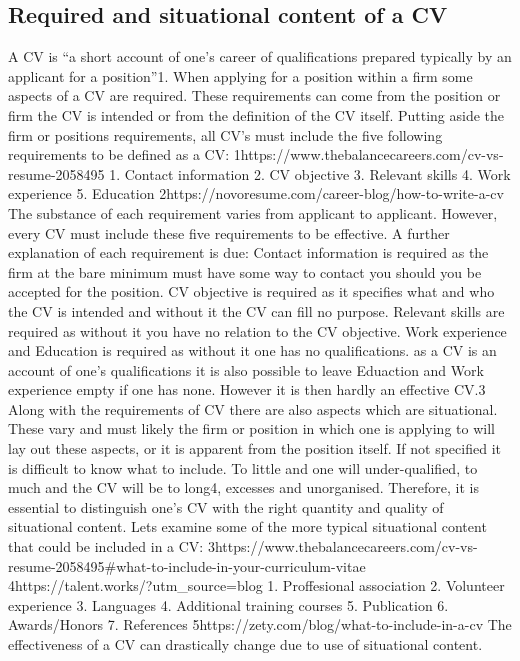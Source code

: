 \subsection{Required and situational content of a CV}
A CV  is “a short account of one’s career of qualifications prepared typically by an applicant for a position”1.
When applying for a position within a firm some aspects of a CV are required.
These requirements can come from the position or firm the CV is intended or from the definition of the CV itself.
Putting aside the firm or positions requirements, all CV’s must include the five following requirements to be defined as a CV:
1https://www.thebalancecareers.com/cv-vs-resume-2058495
1. Contact information
2. CV objective
3. Relevant skills
4. Work experience
5. Education
2https://novoresume.com/career-blog/how-to-write-a-cv
The substance of each requirement varies from applicant to applicant. However, every CV must include these five requirements to be effective.
A further explanation of each requirement is due:
Contact information is required as the firm at the bare minimum must have some way to contact you should you be accepted for the position.
CV objective is required as it specifies what and who the CV is intended and without it the CV can fill no purpose.
Relevant skills are required as without it you have no relation to the CV objective.
Work experience and Education is required as without it one has no qualifications.
as a CV is an account of one’s qualifications it is also possible to leave Eduaction and Work experience empty if one has none.
However it is then hardly an effective CV.3
Along with the requirements of CV there are also aspects which are situational.
These vary and must likely the firm or position in which one is applying to will lay out these aspects, or it is apparent from the position itself.
If not specified it is difficult to know what to include. To little and one will under-qualified, to much and the CV will be to long4, excesses and unorganised.
Therefore, it is essential to distinguish one’s CV with the right quantity and quality of situational content.
Lets examine some of the more typical situational content that could be included in a CV:
3https://www.thebalancecareers.com/cv-vs-resume-2058495#what-to-include-in-your-curriculum-vitae
4https://talent.works/?utm_source=blog
1. Proffesional association
2. Volunteer experience
3. Languages
4. Additional training courses
5. Publication
6. Awards/Honors
7. References
5https://zety.com/blog/what-to-include-in-a-cv
The effectiveness of a CV can drastically change due to use of situational content.
